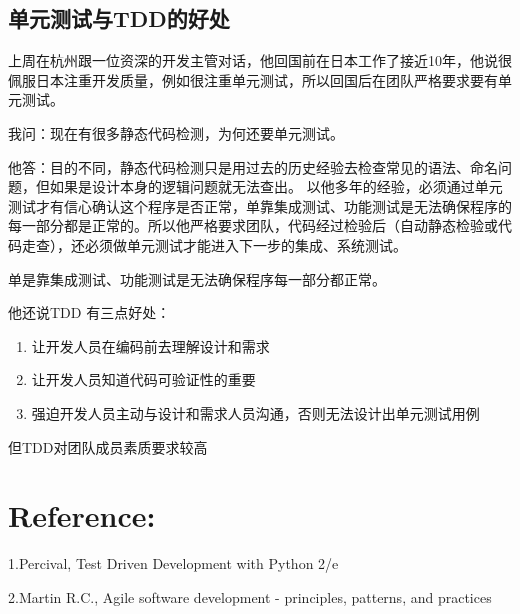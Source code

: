 \hypertarget{ux5355ux5143ux6d4bux8bd5ux4e0etddux7684ux597dux5904}{%
\subsection{单元测试与TDD的好处}\label{ux5355ux5143ux6d4bux8bd5ux4e0etddux7684ux597dux5904}}

上周在杭州跟一位资深的开发主管对话，他回国前在日本工作了接近10年，他说很佩服日本注重开发质量，例如很注重单元测试，所以回国后在团队严格要求要有单元测试。

我问：现在有很多静态代码检测，为何还要单元测试。

他答：目的不同，静态代码检测只是用过去的历史经验去检查常见的语法、命名问题，但如果是设计本身的逻辑问题就无法查出。
以他多年的经验，必须通过单元测试才有信心确认这个程序是否正常，单靠集成测试、功能测试是无法确保程序的每一部分都是正常的。所以他严格要求团队，代码经过检验后（自动静态检验或代码走查），还必须做单元测试才能进入下一步的集成、系统测试。

单是靠集成测试、功能测试是无法确保程序每一部分都正常。

他还说TDD 有三点好处：

\begin{enumerate}
\tightlist
\item
  让开发人员在编码前去理解设计和需求
\item
  让开发人员知道代码可验证性的重要
\item
  强迫开发人员主动与设计和需求人员沟通，否则无法设计出单元测试用例
\end{enumerate}

但TDD对团队成员素质要求较高



\hypertarget{ux9644ux4ef6}{%
\section{Reference:}\label{ux9644ux4ef6}}

1.Percival, Test Driven Development with Python 2/e

2.Martin R.C., Agile software development - principles, patterns, and
practices





